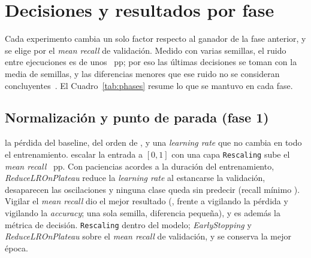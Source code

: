 \section{Decisiones y resultados por fase}
Cada experimento cambia un solo factor respecto al ganador de la fase anterior, y se elige por el \emph{mean recall}
de validación. Medido con varias semillas, el ruido entre ejecuciones es de unos ~pp; por eso las
últimas decisiones se toman con la media de  semillas, y las diferencias menores que ese ruido no se
consideran concluyentes~\cite{bouthillier}. El Cuadro~\ref{tab:phases} resume lo que se mantuvo en cada fase.

\begin{table}[h]
  \centering\small
  \caption{Configuración que se mantiene al final de cada fase (validación; media $\pm$ desviación típica cuando hay
  varias semillas).}
  \label{tab:phases}
\end{table}

\subsection{Normalización y punto de parada (fase 1)}
{la pérdida del baseline, del orden de , y una \emph{learning rate} que no cambia en todo el
entrenamiento.}
{escalar la entrada a $[0, 1]$ con una capa \texttt{Rescaling} sube el \emph{mean recall} ~pp.
Con paciencias acordes a la duración del entrenamiento, \emph{ReduceLROnPlateau} reduce la \emph{learning rate} al
estancarse la validación, desaparecen las oscilaciones y ninguna clase queda sin predecir (recall mínimo
). Vigilar el \emph{mean recall} dio el mejor resultado (, frente a
 vigilando la pérdida y  vigilando la \emph{accuracy};
una sola semilla, diferencia pequeña), y es además la métrica de decisión.}
{\texttt{Rescaling} dentro del modelo; \emph{EarlyStopping} y \emph{ReduceLROnPlateau} sobre el \emph{mean recall}
de validación, y se conserva la mejor época.}

